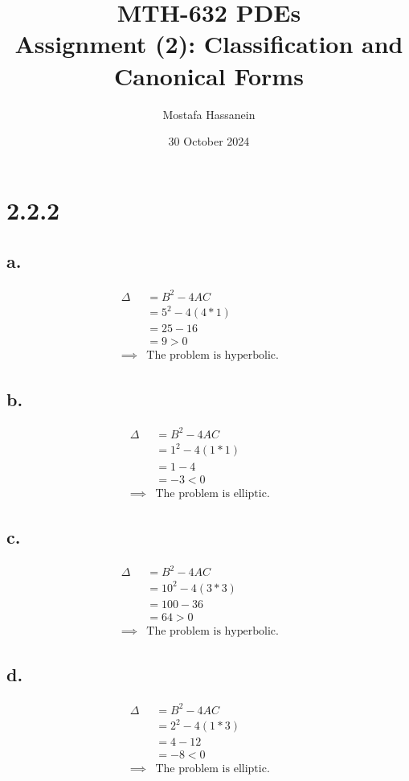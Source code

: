 \documentclass{article}
\author{Mostafa Hassanein}
\title{
  MTH-632 PDEs \\
  Assignment (2): Classification and Canonical Forms}
\date{30 October 2024}
\begin{document}
\maketitle
\newpage
 
\section*{2.2.2}
\subsection*{a.}
\begin{align*}
  \Delta &= B^2 - 4AC &&\\
  &= 5^2 - 4(4*1) &&\\
  &= 25 - 16 &&\\
  &= 9 > 0 &&\\
  \implies& \text{The problem is hyperbolic.}
\end{align*}

\subsection*{b.}
\begin{align*}
  \Delta &= B^2 - 4AC &&\\
  &= 1^2 - 4(1*1) &&\\
  &= 1 - 4 &&\\
  &= -3 < 0 &&\\
  \implies& \text{The problem is elliptic.}
\end{align*}

\subsection*{c.}
\begin{align*}
  \Delta &= B^2 - 4AC &&\\
  &= 10^2 - 4(3*3) &&\\
  &= 100 - 36 &&\\
  &= 64 > 0 &&\\
  \implies& \text{The problem is hyperbolic.}
\end{align*}

\subsection*{d.}
\begin{align*}
  \Delta &= B^2 - 4AC &&\\
  &= 2^2 - 4(1*3) &&\\
  &= 4 - 12 &&\\
  &= -8 < 0 &&\\
  \implies& \text{The problem is elliptic.}
\end{align*}
\end{document}
